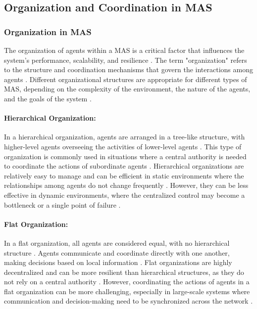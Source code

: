 \subsection{Organization and Coordination in MAS}

\subsubsection{Organization in MAS}

The organization of agents within a MAS is a critical factor that influences the system's performance, scalability, and resilience \cite{wooldridge2009introduction}. The term "organization" refers to the structure and coordination mechanisms that govern the interactions among agents \cite{weiss1999multiagent}. Different organizational structures are appropriate for different types of MAS, depending on the complexity of the environment, the nature of the agents, and the goals of the system \cite{durfee1999distributed}.

\paragraph{Hierarchical Organization:}
In a hierarchical organization, agents are arranged in a tree-like structure, with higher-level agents overseeing the activities of lower-level agents \cite{wooldridge2009introduction}. This type of organization is commonly used in situations where a central authority is needed to coordinate the actions of subordinate agents \cite{durfee1999distributed}. Hierarchical organizations are relatively easy to manage and can be efficient in static environments where the relationships among agents do not change frequently \cite{weiss1999multiagent}. However, they can be less effective in dynamic environments, where the centralized control may become a bottleneck or a single point of failure \cite{durfee1999distributed}.

\paragraph{Flat Organization:}
In a flat organization, all agents are considered equal, with no hierarchical structure \cite{weiss1999multiagent}. Agents communicate and coordinate directly with one another, making decisions based on local information \cite{durfee1999distributed}. Flat organizations are highly decentralized and can be more resilient than hierarchical structures, as they do not rely on a central authority \cite{weiss1999multiagent}. However, coordinating the actions of agents in a flat organization can be more challenging, especially in large-scale systems where communication and decision-making need to be synchronized across the network \cite{durfee1999distributed}.

